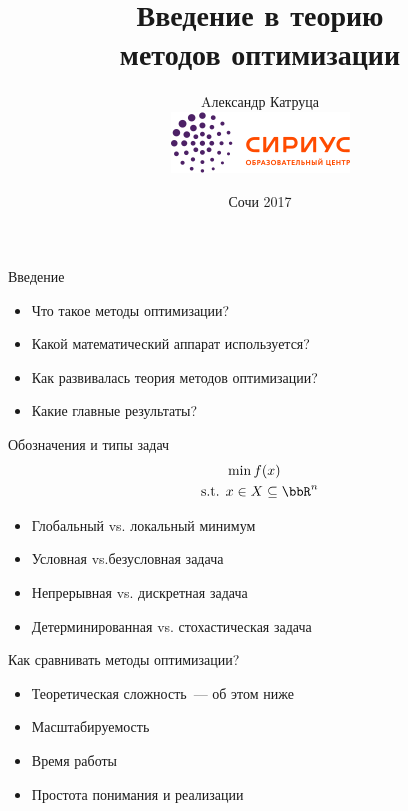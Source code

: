 \documentclass[12pt]{beamer}
\begin{document}
\title[Введение в оптимизацию]{Введение в теорию \\ методов оптимизации}

\author[А. Катруца]{Aлександр Катруца \\[0.9cm] 
\includegraphics[scale=0.5]{logo_sirius}}

\date{Сочи 2017}
\begin{frame}
\maketitle
\end{frame}

\begin{frame}{Введение}

\begin{itemize}
\item Что такое методы оптимизации?
\item Какой математический аппарат используется?
\item Как развивалась теория методов оптимизации?
\item Какие главные результаты?
\end{itemize}

\end{frame}

\begin{frame}{Обозначения и типы задач}
\begin{equation*}
\begin{split}
& \min f(x)\\
\text{s.t. } & x \in X \subseteq \bbR^n
\end{split}
\end{equation*}

\begin{itemize}
\item Глобальный vs. локальный минимум
\item Условная vs.безусловная задача
\item Непрерывная vs. дискретная задача
\item Детерминированная vs. стохастическая задача
\end{itemize}
\end{frame}

\begin{frame}{Как сравнивать методы оптимизации?}
\begin{itemize}
\item Теоретическая сложность~--- об этом ниже
\item Масштабируемость
\item Время работы
\item Простота понимания и реализации
\end{itemize}
\end{frame}
\end{document}
